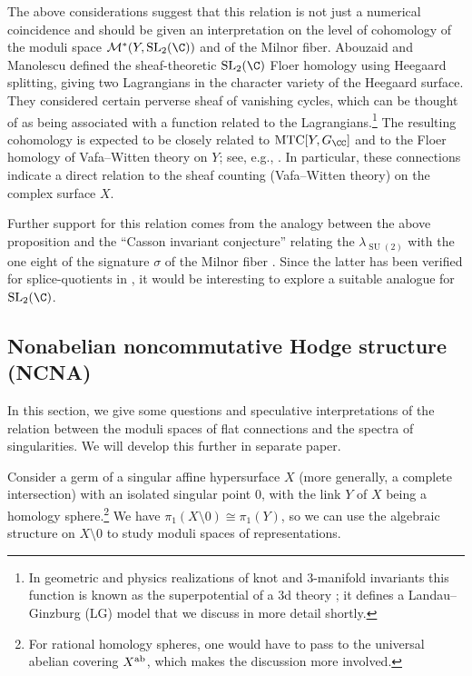 \documentclass[pdftex]{sigma}
\begin{document}
The above considerations suggest that this relation is not just a numerical coincidence and should be given an interpretation on the level of cohomology of the moduli space $\mathcal{M}^*(Y, \operatorname{SL}_2(\C))$ and of the Milnor fiber. Abouzaid and Manolescu defined the sheaf-theoretic $\operatorname{SL}_2(\C)$ Floer homology using Heegaard splitting, giving two Lagrangians in the character variety of the Heegaard surface. They considered certain perverse sheaf of vanishing cycles, which can be thought of as being associated with a function related to the Lagrangians.\footnote{In geometric and physics realizations of knot and 3-manifold invariants this function is known as the superpotential of a 3d theory \cite{ EGGKPSS22, EGGKPS22, FGSS12, GGP13a, GNSSS15,OV99, ERT22}; it defines a Landau--Ginzburg (LG) model that we discuss in more detail shortly.} The resulting cohomology is expected to be closely related to $\text{MTC} [Y, G_{\CC}]$ and to the Floer homology of Vafa--Witten theory on $Y$; see, e.g., \cite{GGP13b, GPV16, GSY22}. In particular, these connections indicate a direct relation to the sheaf counting (Vafa--Witten theory) on the complex surface $X$.

Further support for this relation comes from the analogy between the above proposition and the ``Casson invariant conjecture'' relating the $\lambda_{\operatorname{SU}(2)}$ with the one eight of the signature $\sigma$ of the Milnor fiber \cite{NeuWa90}. Since the latter has been verified for splice-quotients in \cite{NeOk08}, it would be interesting to explore a suitable analogue for $\operatorname{SL}_2(\C)$.

\subsection{Nonabelian noncommutative Hodge structure (NCNA)}

In this section, we give some questions and speculative interpretations of the relation between the moduli spaces of flat connections and the spectra of singularities. We will develop this further in separate paper.

Consider a germ of a singular affine hypersurface $X$ (more generally, a complete intersection) with an isolated singular point $0$, with the link $Y$ of $X$ being a homology sphere.\footnote{For rational homology spheres, one would have to pass to the universal abelian covering $X^{\rm ab}$, which makes the discussion more involved.} We have
$\pi_1(X {\setminus} 0) \cong \pi_1(Y)$,
so we can use the algebraic structure on $X {\setminus} 0$ to study moduli spaces of representations.
\end{document}
